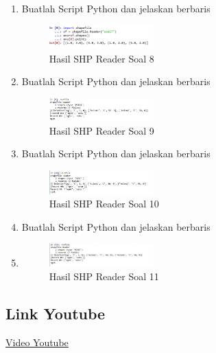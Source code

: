 \begin{enumerate}
    \item Buatlah Script Python dan jelaskan berbaris
    
    \hfill\break
    \begin{figure}[H]
		\includegraphics[width=4cm]{figures/1174003/3/8.png}
		\centering
		\caption{Hasil SHP Reader Soal 8}
    \end{figure}

    \item Buatlah Script Python dan jelaskan berbaris
    
    \hfill\break
    \begin{figure}[H]
		\includegraphics[width=4cm]{figures/1174003/3/9.jpg}
		\centering
		\caption{Hasil SHP Reader Soal 9}
    \end{figure}

    \item Buatlah Script Python dan jelaskan berbaris
    
    \hfill\break
    \begin{figure}[H]
		\includegraphics[width=4cm]{figures/1174003/3/10.jpg}
		\centering
		\caption{Hasil SHP Reader Soal 10}
    \end{figure}

    \item Buatlah Script Python dan jelaskan berbaris
    \item 
    \hfill\break
    \begin{figure}[H]
		\includegraphics[width=4cm]{figures/1174003/3/11.jpg}
		\centering
		\caption{Hasil SHP Reader Soal 11}
    \end{figure}
\end{enumerate}
\subsection{Link Youtube}
\href{https://youtu.be/Apvppjotft8}{Video Youtube}